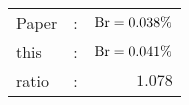       \begin{tabular}{lcr}
          Paper &:& $\mathrm{Br}  = 0.038\%$ \\
          this      &:& $\mathrm{Br}  = 0.041\%$ \\
		  ratio   &:& $1.078$ \\
      \end{tabular}
